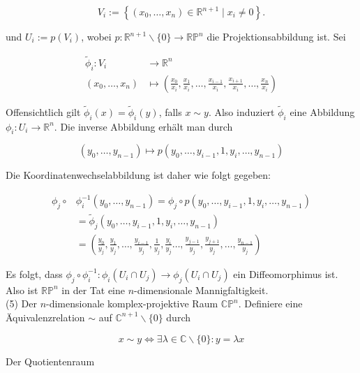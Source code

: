 \documentclass[10pt, letterpaper]{article}
\begin{document}
$$
V_{i}:=\left\{\left(x_{0}, \ldots, x_{n}\right) \in \mathbb{R}^{n+1} \mid x_{i} \neq 0\right\} .
$$

und $U_{i}:=p\left(V_{i}\right)$, wobei $p: \mathbb{R}^{n+1} \backslash\{0\} \rightarrow \mathbb{R} \mathbb{P}^{n}$ die Projektionsabbildung ist. Sei

$$
\begin{aligned}
\tilde{\phi}_{i}: V_{i} & \rightarrow \mathbb{R}^{n} \\
\left(x_{0}, \ldots, x_{n}\right) & \mapsto\left(\frac{x_{0}}{x_{i}}, \frac{x_{1}}{x_{i}}, \ldots, \frac{x_{i-1}}{x_{i}}, \frac{x_{i+1}}{x_{i}}, \ldots, \frac{x_{n}}{x_{i}}\right)
\end{aligned}
$$

Offensichtlich gilt $\tilde{\phi}_{i}(x)=\tilde{\phi}_{i}(y)$, falls $x \sim y$. Also induziert $\tilde{\phi}_{i}$ eine Abbildung $\phi_{i}: U_{i} \rightarrow \mathbb{R}^{n}$. Die inverse Abbildung erhält man durch

$$
\left(y_{0}, \ldots, y_{n-1}\right) \mapsto p\left(y_{0}, \ldots, y_{i-1}, 1, y_{i}, \ldots, y_{n-1}\right)
$$

Die Koordinatenwechselabbildung ist daher wie folgt gegeben:

$$
\begin{aligned}
\phi_{j} \circ & \phi_{i}^{-1}\left(y_{0}, \ldots, y_{n-1}\right)=\phi_{j} \circ p\left(y_{0}, \ldots, y_{i-1}, 1, y_{i}, \ldots, y_{n-1}\right) \\
& =\tilde{\phi}_{j}\left(y_{0}, \ldots, y_{i-1}, 1, y_{i}, \ldots, y_{n-1}\right) \\
& =\left(\frac{y_{0}}{y_{j}}, \frac{y_{1}}{y_{j}}, \ldots, \frac{y_{i-1}}{y_{j}}, \frac{1}{y_{j}}, \frac{y_{i}}{y_{j}} \ldots, \frac{y_{j-1}}{y_{j}}, \frac{y_{j+1}}{y_{j}}, \ldots, \frac{y_{n-1}}{y_{j}}\right)
\end{aligned}
$$

Es folgt, dass $\phi_{j} \circ \phi_{i}^{-1}: \phi_{i}\left(U_{i} \cap U_{j}\right) \rightarrow \phi_{j}\left(U_{i} \cap U_{j}\right)$ ein Diffeomorphimus ist. Also ist $\mathbb{R P}^{n}$ in der Tat eine $n$-dimensionale Mannigfaltigkeit.\\
(5) Der $n$-dimensionale komplex-projektive Raum $\mathbb{C P}^{n}$. Definiere eine Äquivalenzrelation $\sim$ auf $\mathbb{C}^{n+1} \backslash\{0\}$ durch

$$
x \sim y \Longleftrightarrow \exists \lambda \in \mathbb{C} \backslash\{0\}: y=\lambda x
$$

Der Quotientenraum
\end{document}
